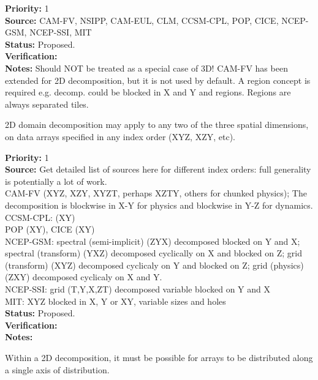\begin{reqlist}
{\bf Priority:} 1 \\ 
{\bf Source:} CAM-FV, NSIPP, CAM-EUL, CLM, CCSM-CPL, POP, CICE, NCEP-GSM, NCEP-SSI, MIT \\
{\bf Status:} Proposed. \\
{\bf Verification:} \\
{\bf Notes:} Should NOT be treated as a special case of 3D!
	CAM-FV has been extended for 2D decomposition, but 
	it is not used by default.
        A region concept is required e.g. decomp. could
        be blocked in X and Y and regions. Regions are always
        separated tiles.
\end{reqlist}


2D domain decomposition may apply to any two of the three spatial
dimensions, on data arrays specified in any index order (XYZ, XZY,
etc).

\begin{reqlist}
{\bf Priority:} 1 \\ 
{\bf Source:} Get detailed list of sources here for different index
  orders: full generality is potentially a lot of work. \\
  CAM-FV  (XYZ, XZY, XYZT, perhaps XZTY, others for chunked physics);
  The decomposition is blockwise in X-Y for physics and blockwise in 
  Y-Z for dynamics.  \\
  CCSM-CPL: (XY) \\
  POP (XY), CICE (XY) \\
  NCEP-GSM: spectral (semi-implicit) (ZYX) decomposed blocked on Y and X; 
            spectral (transform) (YXZ) decomposed cyclically on X and blocked on Z;
            grid (transform) (XYZ) decomposed cyclicaly on Y and blocked on Z; 
            grid (physics) (ZXY) decomposed cyclicaly on X and Y. \\
  NCEP-SSI: grid (T,Y,X,ZT) decomposed variable blocked on Y and X \\
  MIT: XYZ blocked in X, Y or XY, variable sizes and holes \\
{\bf Status:} Proposed. \\
{\bf Verification:} \\
{\bf Notes:}
\end{reqlist}


Within a 2D decomposition, it must be possible for arrays to be
distributed along a single axis of distribution.

